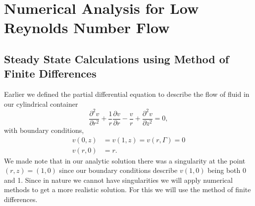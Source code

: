 \documentclass[11pt,letterpaper]{article}
\newcommand{\fdel}[2]{\dfrac{\partial{#1}}{\partial {#2}}} %
\newcommand{\sdel}[2]{\dfrac{\partial^2{#1}}{\partial{#2}^2}} %
\begin{document}
\section{Numerical Analysis for Low Reynolds Number Flow}
\subsection{Steady State Calculations using Method of Finite Differences}
Earlier we defined the partial differential equation to describe the flow of fluid in our cylindrical container 
\begin{equation}\label{eq:LOW RE TIME INDEP}
    \sdel{v}{r} + \dfrac{1}{r}\fdel{v}{r} - \frac{v}{r} + \sdel{v}{z} = 0,
\end{equation}
with boundary conditions, 
\begin{align}
    v(0,z) &= v(1,z) = v(r,\Gamma) = 0\\
    v(r,0) &= r. 
\end{align}
We made note that in our analytic solution there was a singularity at the point $(r,z) = (1,0)$ since our boundary conditions describe $v(1,0)$ being both 0 and 1. Since in nature we cannot have singularities we will apply numerical methods to get a more realistic solution. For this we will use the method of finite differences.
\end{document}
